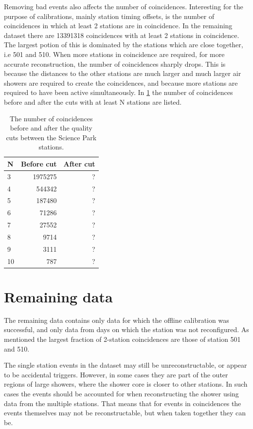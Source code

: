 Removing bad events also affects the number of coincidences. Interesting for the purpose of calibrations, mainly station timing offsets, is the number of coincidences in which at least 2 stations are in coincidence. In the remaining dataset there are \num{13391318} coincidences with at least 2 stations in coincidence. The largest potion of this is dominated by the stations which are close together, i.e 501 and 510. When more stations in coincidence are required, for more accurate reconstruction, the number of coincidences sharply drops. This is because the distances to the other stations are much larger and much larger air showers are required to create the coincidences, and because more stations are required to have been active simultaneously. In \cref{tab:remaining_coincidences} the number of coincidences before and after the cuts with at least N stations are listed.

\begin{table}
    \centering
    \begin{tabular}{@{}lrr@{}}
        \toprule
        N  & Before cut & After cut \\
        \midrule
         3 &    1975275 &         ? \\
         4 &     544342 &         ? \\
         5 &     187480 &         ? \\
         6 &      71286 &         ? \\
         7 &      27552 &         ? \\
         8 &       9714 &         ? \\
         9 &       3111 &         ? \\
        10 &        787 &         ? \\
        \bottomrule
    \end{tabular}
    \caption{The number of coincidences before and after the quality cuts between the Science Park stations.}
    \label{tab:remaining_coincidences}
\end{table}


\section{Remaining data}

The remaining data contains only data for which the offline calibration was successful, and only data from days on which the station was not reconfigured. As mentioned the largest fraction of 2-station coincidences are those of station 501 and 510.

The single station events in the dataset may still be unreconstructable, or appear to be accidental triggers. However, in some cases they are part of the outer regions of large showers, where the shower core is closer to other stations. In such cases the events should be accounted for when reconstructing the shower using data from the multiple stations. That means that for events in coincidences the events themselves may not be reconstructable, but when taken together they can be.
